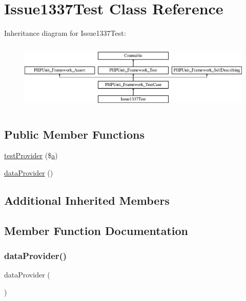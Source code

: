 \hypertarget{class_issue1337_test}{}\section{Issue1337\+Test Class Reference}
\label{class_issue1337_test}
Inheritance diagram for Issue1337\+Test\+:\begin{figure}[H]
\begin{center}
\leavevmode
\includegraphics[height=3.303835cm]{class_issue1337_test}
\end{center}
\end{figure}
\subsection*{Public Member Functions}
\begin{DoxyCompactItemize}
\item 
\mbox{\hyperlink{class_issue1337_test_a46d45f40c248127cf9b04386050b8fe6}{test\+Provider}} (\$\mbox{\hyperlink{interfacea}{a}})
\item 
\mbox{\hyperlink{class_issue1337_test_a5b640f9874e358f482cc4135fcb88ab7}{data\+Provider}} ()
\end{DoxyCompactItemize}
\subsection*{Additional Inherited Members}


\subsection{Member Function Documentation}
\mbox{\label{class_issue1337_test_a5b640f9874e358f482cc4135fcb88ab7}} 
\subsubsection{\texorpdfstring{data\+Provider()}{dataProvider()}}
{\footnotesize\ttfamily data\+Provider (\begin{DoxyParamCaption}{ }\end{DoxyParamCaption})}


